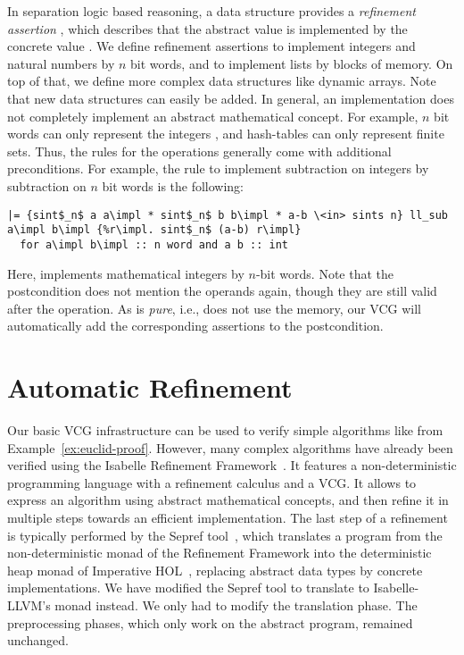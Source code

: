 \documentclass[a4paper,USenglish,cleveref, autoref]{lipics-v2019}
\begin{document}
In separation logic based reasoning, a data structure provides a \emph{refinement assertion} , which describes 
that the abstract value  is implemented by the concrete value . 
We define refinement assertions to implement integers and natural numbers by $n$ bit words, and to implement lists by blocks of memory.
On top of that, we define more complex data structures like dynamic arrays.
Note that new data structures can easily be added. In general, an implementation does not completely implement an abstract mathematical concept.
For example, $n$ bit words can only represent the integers , and hash-tables can only represent finite sets. Thus, the rules for the operations generally come with additional preconditions. 
For example, the rule to implement subtraction on integers by subtraction on $n$ bit words is the following:
\begin{lstlisting}
|= {sint$_n$ a a\impl * sint$_n$ b b\impl * a-b \<in> sints n} ll_sub a\impl b\impl {%r\impl. sint$_n$ (a-b) r\impl}
  for a\impl b\impl :: n word and a b :: int
\end{lstlisting}
Here,  implements mathematical integers by $n$-bit words.
Note that the postcondition does not mention the operands  again, though they are still valid after the operation. 
As  is \emph{pure}, i.e., does not use the memory, our VCG will automatically add the corresponding assertions to the postcondition. 


\section{Automatic Refinement}\label{sec:auto_ref}
Our basic VCG infrastructure can be used to verify simple algorithms like  from Example~\ref{ex:euclid-proof}.
However, many complex algorithms have already been verified using the Isabelle Refinement Framework~\cite{LaTu12}.
It features a non-deterministic programming language with a refinement calculus and a VCG. 
It allows to express an algorithm using abstract mathematical concepts, and then refine it in multiple steps towards an efficient implementation.
The last step of a refinement is typically performed by the Sepref tool~\cite{La15}, which translates a program from the non-deterministic monad of the Refinement Framework 
into the deterministic heap monad of Imperative HOL~\cite{BKHEM08}, replacing abstract data types by concrete implementations. 
%
We have modified the Sepref tool to translate to Isabelle-LLVM's monad instead.
We only had to modify the translation phase. The preprocessing phases, which only work on the abstract program, remained unchanged.
\end{document}
